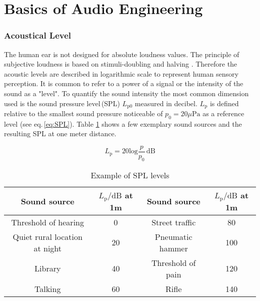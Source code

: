 \section{Basics of Audio Engineering}\label{cap:BasicsOfAudio}
\subsubsection{Acoustical Level}

The human ear is not designed for absolute loudness values. The principle of
subjective loudness is based on stimuli-doubling and halving \cite[p.\,3]{Gorne:2015}. Therefore the acoustic
levels are described in logarithmic scale to represent human sensory perception.
It is common to refer to a power of a signal or the intensity of the sound as a "level".
To quantify the sound intensity the most common dimension used is the sound pressure level\,(SPL) $L_{\mathrm{p 0}}$ measured
in decibel.
$L_{\mathrm{p}}$ is defined relative to the smallest sound pressure noticeable of $p_0 = 20 \mu \mathrm{Pa}$ as a reference level (see eq.\,\ref{eq:SPL}).
Table \ref{tab:SPLs} shows a few exemplary sound sources and the resulting SPL at one meter distance.


\begin{equation}
L_{\mathrm{p}} = 20 \mathrm{log} \frac{p}{p_0}\, \mathrm{dB}
\label{eq:SPL}
\end{equation}

\begin{table}[H]
\begin{center}
\begin{tabular}{|c|c||c|c|}
\hline 
\textbf{Sound source} & \textbf{$L_{\mathrm{p}}/\mathrm{dB}$ at 1m} & \textbf{Sound source} & \textbf{$L_{\mathrm{p}}/\mathrm{dB}$ at 1m}  \\ 
\hline 
\hline
Threshold of hearing & 0 & Street traffic & 80 \\ 
\hline 
Quiet rural location at night & 20 & Pneumatic hammer & 100 \\ 
\hline 
Library & 40 & Threshold of pain & 120 \\ 
\hline 
Talking & 60 & Rifle & 140 \\ 
\hline 
\end{tabular} 
\caption[oi]{Example of SPL levels\footnotemark}
\end{center}
\label{tab:SPLs}
\end{table}

